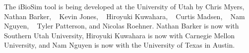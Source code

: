 \documentclass[titlepage,11pt]{article}
\begin{document}
\noindent
The iBioSim tool is being developed at the University of Utah
by 
Chris Myers,
~
Nathan Barker,
~
Kevin Jones,
~
Hiroyuki Kuwahara,
~
Curtis Madsen,
~
Nam Nguyen,
~
Tyler Patterson,
and
Nicolas Roehner.
Nathan Barker is now with Southern Utah University, Hiroyuki
Kuwahara is now with Carnegie Mellon University, and Nam Nguyen is now with
the University of Texas in Austin.
  
\end{document}
